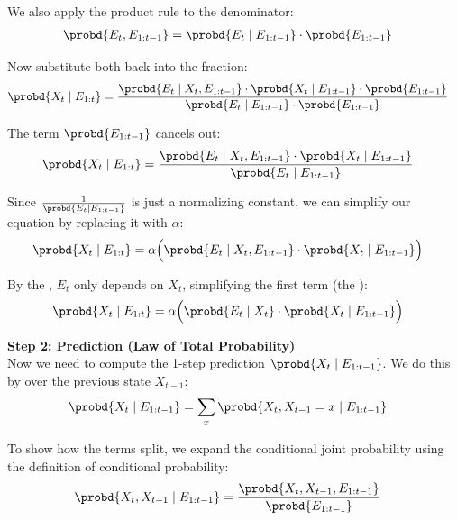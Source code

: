 We also apply the product rule to the denominator:
\begin{align*}
\probd{E_t, E_{1:t-1}} &= \probd{E_t \mid E_{1:t-1}} \cdot \probd{E_{1:t-1}}
\end{align*}

Now substitute both back into the fraction:
\begin{align*}
\probd{X_t \mid E_{1:t}} &= \frac{\probd{E_t \mid X_t, E_{1:t-1}} \cdot \probd{X_t \mid E_{1:t-1}} \cdot \probd{E_{1:t-1}}}{\probd{E_t \mid E_{1:t-1}} \cdot \probd{E_{1:t-1}}}
\end{align*}

The term $\probd{E_{1:t-1}}$ cancels out:
\begin{align*}
\probd{X_t \mid E_{1:t}} &= \frac{\probd{E_t \mid X_t, E_{1:t-1}} \cdot \probd{X_t \mid E_{1:t-1}}}{\probd{E_t \mid E_{1:t-1}}}
\end{align*}

Since $\frac{1}{\probd{E_t \mid E_{1:t-1}}}$ is just a normalizing constant, we can simplify our equation by replacing it with $\alpha$:
\begin{align*}
\probd{X_t \mid E_{1:t}} &= \alpha \Big( \probd{E_t \mid X_t, E_{1:t-1}} \cdot \probd{X_t \mid E_{1:t-1}} \Big)
\end{align*}

By the , $E_t$ only depends on $X_t$, simplifying the first term (the ):
\begin{align*}
\probd{X_t \mid E_{1:t}} &= \alpha \Big( \probd{E_t \mid X_t} \cdot \probd{X_t \mid E_{1:t-1}} \Big)
\end{align*}

\textbf{Step 2: Prediction (Law of Total Probability)} \\
Now we need to compute the 1-step prediction $\probd{X_t \mid E_{1:t-1}}$. We do this by  over the previous state $X_{t-1}$:
\begin{align*}
\probd{X_t \mid E_{1:t-1}} &= \sum_{x} \probd{X_t, X_{t-1} = x \mid E_{1:t-1}}
\end{align*}

To show how the terms split, we expand the conditional joint probability using the definition of conditional probability:
\begin{align*}
\probd{X_t, X_{t-1} \mid E_{1:t-1}} &= \frac{\probd{X_t, X_{t-1}, E_{1:t-1}}}{\probd{E_{1:t-1}}}
\end{align*}

